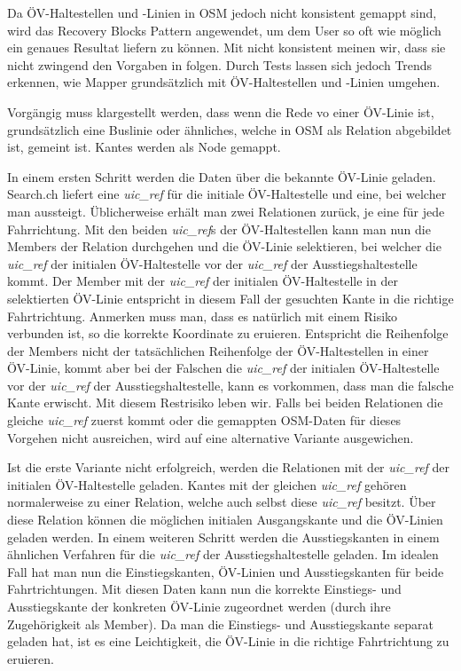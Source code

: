 Da ÖV-Haltestellen und -Linien in \ac{OSM} jedoch nicht konsistent gemappt sind, wird das Recovery Blocks Pattern \cite{fault_tolerant_software} angewendet, um dem User so oft wie möglich ein genaues Resultat liefern zu können. Mit nicht konsistent meinen wir, dass sie nicht zwingend den Vorgaben in \cite{osm_wiki_relation} folgen. Durch Tests lassen sich jedoch Trends erkennen, wie Mapper grundsätzlich mit ÖV-Haltestellen und -Linien umgehen.

Vorgängig muss klargestellt werden, dass wenn die Rede vo einer ÖV-Linie ist, grundsätzlich eine Buslinie oder ähnliches, welche in \ac{OSM} als Relation \cite{osm_wiki_relation} abgebildet ist, gemeint ist. \glspl{Kante} werden als \gls{Node} gemappt.

In einem ersten Schritt werden die Daten über die bekannte ÖV-Linie geladen. Search.ch \cite{search_ch_route_api} liefert eine \emph{uic\_ref} für die initiale ÖV-Haltestelle und eine, bei welcher man aussteigt. Üblicherweise erhält man zwei Relationen zurück, je eine für jede Fahrrichtung. Mit den beiden \emph{uic\_ref}s der ÖV-Haltestellen kann man nun die Members der Relation durchgehen und die ÖV-Linie selektieren, bei welcher die \emph{uic\_ref} der initialen ÖV-Haltestelle vor der \emph{uic\_ref} der Ausstiegshaltestelle kommt. Der Member mit der \emph{uic\_ref} der initialen ÖV-Haltestelle in der selektierten ÖV-Linie entspricht in diesem Fall der gesuchten \gls{Kante} in die richtige Fahrtrichtung.
Anmerken muss man, dass es natürlich mit einem Risiko verbunden ist, so die korrekte Koordinate zu eruieren. Entspricht die Reihenfolge der Members nicht der tatsächlichen Reihenfolge der ÖV-Haltestellen in einer ÖV-Linie, kommt aber bei der Falschen die \emph{uic\_ref} der initialen ÖV-Haltestelle vor der \emph{uic\_ref} der Ausstiegshaltestelle, kann es vorkommen, dass man die falsche Kante erwischt. Mit diesem Restrisiko leben wir. Falls bei beiden Relationen die gleiche \emph{uic\_ref} zuerst kommt oder die gemappten \ac{OSM}-Daten für dieses Vorgehen nicht ausreichen, wird auf eine alternative Variante ausgewichen. 

Ist die erste Variante nicht erfolgreich, werden die Relationen mit der \emph{uic\_ref} der initialen ÖV-Haltestelle geladen. \glspl{Kante} mit der gleichen \emph{uic\_ref} gehören normalerweise zu einer Relation, welche auch selbst diese \emph{uic\_ref} besitzt. Über diese Relation können die möglichen initialen Ausgangskante und die ÖV-Linien geladen werden. In einem weiteren Schritt werden die Ausstiegskanten in einem ähnlichen Verfahren für die \emph{uic\_ref} der Ausstiegshaltestelle geladen. Im idealen Fall hat man nun die Einstiegskanten, ÖV-Linien und Ausstiegskanten für beide Fahrtrichtungen. Mit diesen Daten kann nun die korrekte Einstiegs- und Ausstiegskante der konkreten ÖV-Linie zugeordnet werden (durch ihre Zugehörigkeit als Member). Da man die Einstiegs- und Ausstiegskante separat geladen hat, ist es eine Leichtigkeit, die ÖV-Linie in die richtige Fahrtrichtung zu eruieren.

